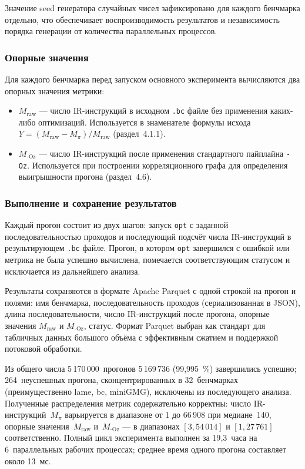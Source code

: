 Значение seed генератора случайных чисел зафиксировано для каждого бенчмарка отдельно, что обеспечивает воспроизводимость результатов и независимость порядка генерации от количества параллельных процессов.

\subsubsection{Опорные значения}

Для каждого бенчмарка перед запуском основного эксперимента вычисляются два опорных значения метрики:
\begin{itemize}
    \item $M_{\text{raw}}$ --- число IR-инструкций в исходном \texttt{.bc} файле без применения каких-либо оптимизаций. Используется в знаменателе формулы исхода $Y = (M_{\text{raw}} - M_\pi) / M_{\text{raw}}$ (раздел~4.1.1).
    \item $M_{\text{-Oz}}$ --- число IR-инструкций после применения стандартного пайплайна \texttt{-Oz}. Используется при построении корреляционного графа для определения выигрышности прогона (раздел~4.6).
\end{itemize}

\subsubsection{Выполнение и сохранение результатов}

Каждый прогон состоит из двух шагов: запуск \texttt{opt} с заданной последовательностью проходов и последующий подсчёт числа IR-инструкций в результирующем \texttt{.bc} файле. Прогон, в котором \texttt{opt} завершился с ошибкой или метрика не была успешно вычислена, помечается соответствующим статусом и исключается из дальнейшего анализа.

Результаты сохраняются в формате Apache Parquet с одной строкой на прогон и полями: имя бенчмарка, последовательность проходов (сериализованная в JSON), длина последовательности, число IR-инструкций после прогона, опорные значения $M_{\text{raw}}$ и $M_{\text{-Oz}}$, статус. Формат Parquet выбран как стандарт для табличных данных большого объёма с эффективным сжатием и поддержкой потоковой обработки.

Из общего числа 5\,170\,000~прогонов 5\,169\,736 (99{,}995~\%) завершились успешно; 264~неуспешных прогона, сконцентрированных в 32~бенчмарках (преимущественно lame, bc, miniGMG), исключены из последующего анализа. Полученные распределения метрик содержательно корректны: число IR-инструкций~$M_\pi$ варьируется в диапазоне от 1 до 66\,908 при медиане~140, опорные значения~$M_{\text{raw}}$ и~$M_{\text{-Oz}}$ --- в диапазонах $[3, 54\,014]$ и $[1, 27\,761]$ соответственно. Полный цикл эксперимента выполнен за 19{,}3~часа на 6~параллельных рабочих процессах; среднее время одного прогона составляет около 13~мс.

